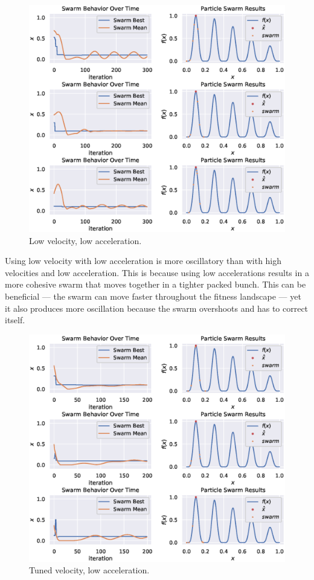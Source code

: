 \documentclass[12pt]{article}
\begin{document}
\begin{figure}[H]
    \centering
    \includegraphics[width=\textwidth]{figures/pso-low-vel-low-accel.eps}
    \caption{Low velocity, low acceleration.}\label{fig:pso:low-vel-low-accel}
\end{figure}

Using low velocity with low acceleration is more oscillatory than with high velocities and low acceleration.
This is because using low accelerations results in a more cohesive swarm that moves together in a tighter packed bunch.
This can be beneficial --- the swarm can move faster throughout the fitness landscape --- yet it also produces more oscillation because the swarm overshoots and has to correct itself.

\begin{figure}[H]
    \centering
    \includegraphics[width=\textwidth]{figures/pso-tuned-vel-low-accel.eps}
    \caption{Tuned velocity, low acceleration.}\label{fig:pso:tuned-vel-low-accel}
\end{figure}
\end{document}
